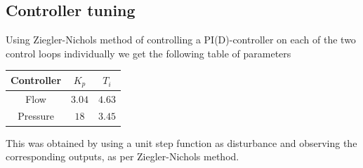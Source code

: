\documentclass[a4paper]{scrartcl}
\begin{document}
\subsection{Controller tuning}
Using Ziegler-Nichols method of controlling a PI(D)-controller on each of the two control loops individually we get the following table of parameters

\begin{center}
	\begin{tabular}{c|c|c}
		Controller & $K_p$ & $T_i$ \\
		\hline
		Flow & $3.04$ & $4.63$\\
		Pressure & $18$ & $3.45$
	\end{tabular}
\end{center}
This was obtained by using a unit step function as disturbance and observing the corresponding outputs, as per Ziegler-Nichols method.
\end{document}
